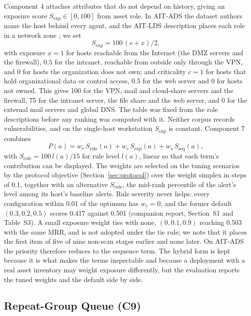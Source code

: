 \documentclass[conference]{IEEEtran}
\begin{document}
Component 4 attaches attributes that do not depend on history, giving an exposure score $S_\mathrm{exp} \in [0,100]$ from asset role. In AIT-ADS the dataset authors name the host behind every agent, and the AIT-LDS description places each role in a network zone \cite{ref22}; we set
\begin{equation}
S_\mathrm{exp} = 100\,(c + x)/2,
\end{equation}
with exposure $x = 1$ for hosts reachable from the Internet (the DMZ servers and the firewall), $0.5$ for the intranet, reachable from outside only through the VPN, and $0$ for hosts the organization does not own; and criticality $c = 1$ for hosts that hold organizational data or control access, $0.5$ for the web server and $0$ for hosts not owned. This gives 100 for the VPN, mail and cloud-share servers and the firewall, 75 for the intranet server, the file share and the web server, and 0 for the external mail servers and global DNS. The table was fixed from the role descriptions before any ranking was computed with it. Neither corpus records vulnerabilities, and on the single-host workstation $S_\mathrm{exp}$ is constant. Component 7 combines
\begin{equation}
P(a) = w_r\, S_\mathrm{rule}(a) + w_c\, S_\mathrm{exp}(a) + w_s\, S_\mathrm{seq}(a),
\end{equation}
with $S_\mathrm{rule} = 100\, l(a)/15$ for rule level $l(a)$, linear so that each term's contribution can be displayed. The weights are selected on the tuning scenarios by the protocol objective (Section~\ref{sec:protocol}) over the weight simplex in steps of 0.1, together with an alternative $S_\mathrm{rule}$, the mid-rank percentile of the alert's level among its host's baseline alerts. Rule severity never helps: every configuration within 0.01 of the optimum has $w_r = 0$, and the former default $(0.3, 0.2, 0.5)$ scores 0.417 against 0.501 (companion report, Section~S1 and Table~S3). A small exposure weight ties with none, $(0, 0.1, 0.9)$ reaching 0.503 with the same MRR, and is not adopted under the tie rule; we note that it places the first item of five of nine non-scan stages earlier and none later. On AIT-ADS the priority therefore reduces to the sequence term. The hybrid form is kept because it is what makes the terms inspectable and because a deployment with a real asset inventory may weight exposure differently, but the evaluation reports the tuned weights and the default side by side.

\subsection{Repeat-Group Queue (C9)}
\label{sec:queue}
\end{document}
